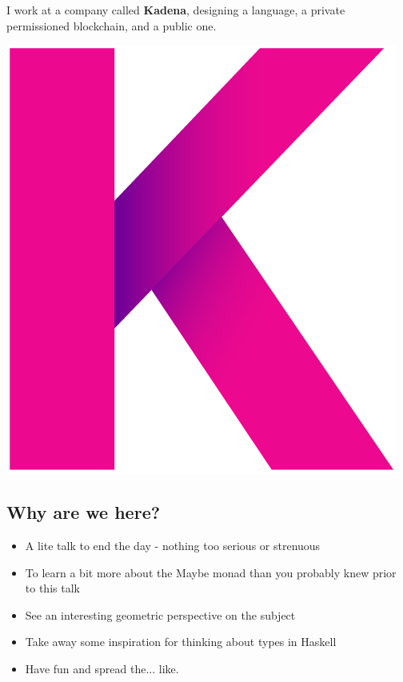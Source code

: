 \documentclass[tikz]{beamer}
\theoremstyle{definition}
\begin{document}
\frame
{ 
	I work at a company called \textbf{Kadena}, designing a language, a private permissioned blockchain, and a public one.
	\begin{center}
		\includegraphics[scale=0.4]{kadena}
	\end{center}
	
}

\subsection{Why are we here?}
\frame
{
	\begin{itemize}
		\item A lite talk to end the day - nothing too serious or strenuous
		\item To learn a bit more about the Maybe monad than you probably knew prior to this talk
		\item See an interesting geometric perspective on the subject
		\item Take away some inspiration for thinking about types in Haskell
		\item Have fun and spread the... like.
		
	\end{itemize}
}
\end{document}

